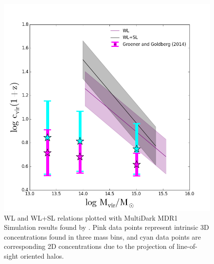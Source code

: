 \begin{figure}
\begin{center}
\includegraphics[width=\textwidth]{./images/CMRelationProject/ObsCM_WLandWLSL_NoExtrapandSimsandPSims.png}
\end{center}
\caption[Lensing Relations and MDR1 Halos]{WL and WL+SL relations plotted with MultiDark MDR1 Simulation results
  found by \citet{GR14.1}. Pink data points represent intrinsic 3D
  concentrations found in three mass bins, and cyan data points are
  corresponding 2D concentrations due to the projection of line-of-sight
  oriented halos.}
\end{figure}

